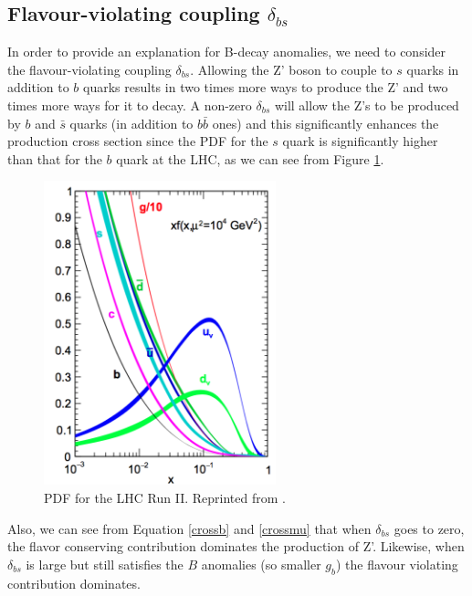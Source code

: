 \subsection{Flavour-violating coupling $\delta_{bs}$}
In order to provide an explanation for B-decay anomalies, we need to consider the flavour-violating coupling $\delta_{bs}$. Allowing the Z' boson to couple to $s$ quarks in addition to $b$ quarks results in two times more ways to produce the Z' and two times more ways for it to decay. A non-zero $\delta_{bs}$ will allow the Z's to be produced by $b$ and $\bar{s}$ quarks (in addition to $b\bar{b}$ ones) and this significantly enhances the production cross section since the PDF for the $s$ quark is significantly higher than that for the $b$ quark at the LHC, as we can see from Figure \ref{fig:pdfs}.

 \begin{figure}[H]
 	\centering
 	\includegraphics[width=0.6\textwidth]{figures/pdfs.png}
 	\singlespace
 	\caption{PDF for the LHC Run II. Reprinted from \cite{Ball:2014uwa}.}
 	\label{fig:pdfs}
 \end{figure}

Also, we can see from Equation \ref{crossb} and \ref{crossmu} that when $\delta_{bs}$ goes to zero, the flavor conserving contribution dominates the production of Z'. Likewise, when $\delta_{bs}$ is large but still satisfies the $B$ anomalies (so smaller $g_{b}$) the flavour violating contribution dominates.


